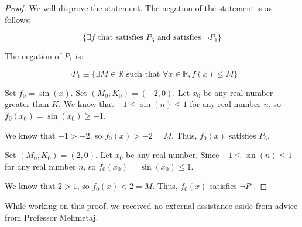 \documentclass[12pt]{article}
\begin{document}
\begin{proof} We will disprove the statement. The negation of the statement is as follows:

    $$\{ \exists f \text{ that satisfies } P_6 \text{ and satisfies } \lnot P_1 \}$$

    The negation of $P_1$ is:

    $$\lnot P_1 \equiv \{ \exists M \in \mathbb{R} \text{ such that } \forall x \in \mathbb{R}, f(x) \leq M\}$$

    Set $f_0 = \sin(x)$. Set $(M_0, K_0) = (-2, 0)$. Let $x_0$ be any real number greater than $K$. We know that $-1 \leq \sin(n) \leq 1$ for any real number $n$, so $f_0(x_0) = \sin(x_0) \geq -1$.

    We know that $-1 > -2$, so $f_0(x) > -2 = M$. Thus, $f_0(x)$ satisfies $P_6.$

    Set $(M_0, K_0) = (2, 0)$. Let $x_0$ be any real number. Since $-1 \leq \sin(n) \leq 1$ for any real number $n$, so $f_0(x_0) = \sin(x_0) \leq 1$.

    We know that $2 > 1$, so $f_0(x) < 2 = M$. Thus, $f_0(x)$ satisfies $\lnot P_1$. 


\end{proof}


\noindent While working on this proof, we received no external assistance aside from advice from Professor Mehmetaj.
\end{document}
